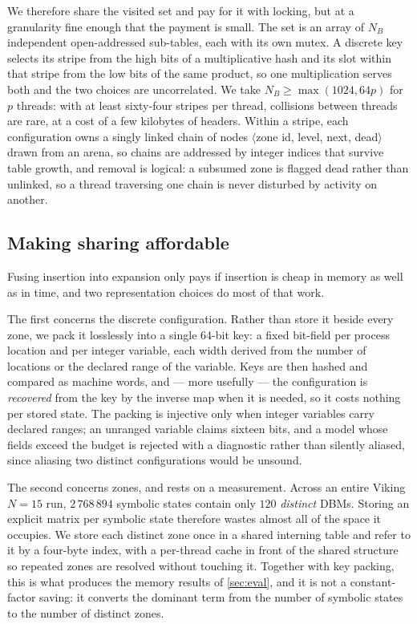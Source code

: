 We therefore share the visited set and pay for it with locking, but at a granularity fine
enough that the payment is small. The set is an array of $N_B$ independent open-addressed
sub-tables, each with its own mutex. A discrete key selects its stripe from the high bits of a
multiplicative hash and its slot within that stripe from the low bits of the same product, so
one multiplication serves both and the two choices are uncorrelated. We take
$N_B \ge \max(1024, 64p)$ for $p$ threads: with at least sixty-four stripes per thread,
collisions between threads are rare, at a cost of a few kilobytes of headers. Within a stripe,
each configuration owns a singly linked chain of nodes $\langle$zone id, level, next,
dead$\rangle$ drawn from an arena, so chains are addressed by integer indices that survive
table growth, and removal is logical: a subsumed zone is flagged dead rather than unlinked,
so a thread traversing one chain is never disturbed by activity on another.

\subsection{Making sharing affordable}

Fusing insertion into expansion only pays if insertion is cheap in memory as well as in time,
and two representation choices do most of that work.

The first concerns the discrete configuration. Rather than store it beside every zone, we pack
it losslessly into a single 64-bit key: a fixed bit-field per process location and per integer
variable, each width derived from the number of locations or the declared range of the
variable. Keys are then hashed and compared as machine words, and --- more usefully --- the
configuration is \emph{recovered} from the key by the inverse map when it is needed, so it
costs nothing per stored state. The packing is injective only when integer variables carry
declared ranges; an unranged variable claims sixteen bits, and a model whose fields exceed the
budget is rejected with a diagnostic rather than silently aliased, since aliasing two distinct
configurations would be unsound.

The second concerns zones, and rests on a measurement. Across an entire Viking $N{=}15$ run,
$2\,768\,894$ symbolic states contain only $120$ \emph{distinct} DBMs. Storing an explicit
matrix per symbolic state therefore wastes almost all of the space it occupies. We store each
distinct zone once in a shared interning table and refer to it by a four-byte index, with a
per-thread cache in front of the shared structure so repeated zones are resolved without
touching it. Together with key packing, this is what produces the memory results of
\cref{sec:eval}, and it is not a constant-factor saving: it converts the dominant term from
the number of symbolic states to the number of distinct zones.

